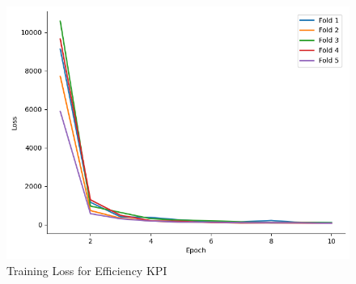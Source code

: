 \documentclass{report} %
\begin{document}
\begin{figure}[H]
\begin{minipage}[b]{0.325\textwidth}
        \includegraphics[width=\textwidth]{./ReportImages/train_loss_y2.png}
        \caption{\centering Training Loss for Efficiency \ac{KPI}}
        \label{fig:Training Loss for Efficiency grid}
    \end{minipage}
\end{figure}
\end{document}
